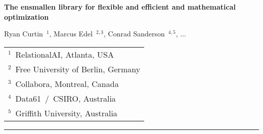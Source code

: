 \documentclass[10pt]{article}
\begin{document}
\pagestyle{empty}

\begin{center}

{\Large\bf The ensmallen library for flexible and efficient and  mathematical optimization}

\vspace{1.5ex}
  {Ryan Curtin~{$^1$}, Marcus Edel~{$^{2,3}$}, Conrad Sanderson~{$^{4,5}$}, ...}
\vspace{1.5ex}


\begin{tabular}{l}
$^1$~RelationalAI, Atlanta, USA\\
$^2$~Free University of Berlin, Germany\\
$^3$~Collabora, Montreal, Canada\\
$^4$~Data61~/~CSIRO, Australia\\
$^5$~Griffith University, Australia
\end{tabular}

\end{center}




\vspace{4ex}
\hrule





  
  
  \clearpage
  
\clearpage



\clearpage
\newpage

\appendix
{}
  
  
  

\clearpage
\newpage


\end{document}
